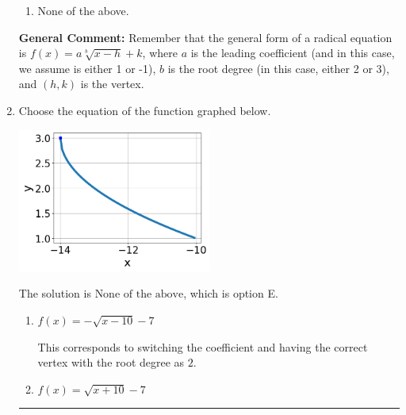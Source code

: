 \documentclass{extbook}[14pt]
\newcommand{\litem}[1]{\item #1

\rule{\textwidth}{0.4pt}}
\begin{document}
\begin{enumerate}
{\begin{enumerate}[label=\Alph*.]
\item None of the above.\end{enumerate}
\textbf{General Comment:} Remember that the general form of a radical equation is $ f(x) = a \sqrt[b]{x - h} + k $, where $a$ is the leading coefficient (and in this case, we assume is either 1 or -1), $b$ is the root degree (in this case, either 2 or 3), and $(h, k)$ is the vertex.
}
\litem{
Choose the equation of the function graphed below.

\begin{center}
    \includegraphics[width=0.5\textwidth]{../Figures/radicalGraphToEquationCopyB.png}
\end{center}


The solution is \( \text{None of the above} \), which is option E.\begin{enumerate}[label=\Alph*.]
\item \( f(x) = - \sqrt{x - 10} - 7 \)

This corresponds to switching the coefficient and having the correct vertex with the root degree as $2$.
\item \( f(x) = \sqrt{x + 10} - 7 \)


\end{enumerate}}
\end{enumerate}
\end{document}
